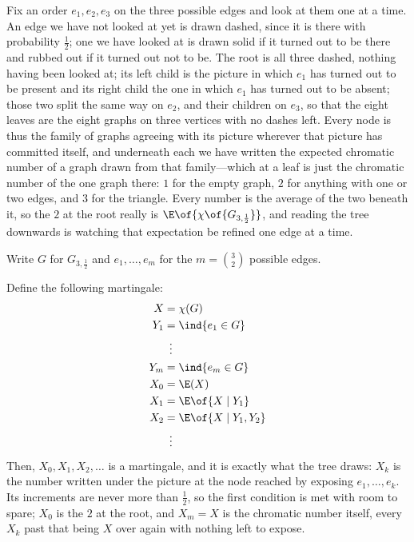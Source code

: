 Fix an order $e_1, e_2, e_3$ on the three possible edges and look at them one at a time. An edge we have not looked at yet is drawn dashed, since it is there with probability $\frac{1}{2}$; one we have looked at is drawn solid if it turned out to be there and rubbed out if it turned out not to be. The root is all three dashed, nothing having been looked at; its left child is the picture in which $e_1$ has turned out to be present and its right child the one in which $e_1$ has turned out to be absent; those two split the same way on $e_2$, and their children on $e_3$, so that the eight leaves are the eight graphs on three vertices with no dashes left. Every node is thus the family of graphs agreeing with its picture wherever that picture has committed itself, and underneath each we have written the expected chromatic number of a graph drawn from that family---which at a leaf is just the chromatic number of the one graph there: $1$ for the empty graph, $2$ for anything with one or two edges, and $3$ for the triangle. Every number is the average of the two beneath it, so the $2$ at the root really is $\E\of{\chi\of{G_{3, \frac{1}{2}}}}$, and reading the tree downwards is watching that expectation be refined one edge at a time.

Write $G$ for $G_{3, \frac{1}{2}}$ and $e_1, \ldots, e_m$ for the $m = \binom{3}{2}$ possible edges.

Define the following martingale:
\begin{align*}
    X &= \chi(G) \\
    Y_1 &= \ind{e_1 \in G} \\
    & \,\,\, \vdots \\
    Y_m &= \ind{e_m \in G} \\
    X_0 &= \E(X) \\
    X_1 &= \E\of{X \mid Y_1} \\
    X_2 &= \E\of{X \mid Y_1, Y_2} \\
    & \,\,\, \vdots
\end{align*}
Then, $X_0, X_1, X_2, \ldots$ is a martingale, and it is exactly what the tree draws: $X_k$ is the number written under the picture at the node reached by exposing $e_1, \ldots, e_k$. Its increments are never more than $\frac{1}{2}$, so the first condition is met with room to spare; $X_0$ is the $2$ at the root, and $X_m = X$ is the chromatic number itself, every $X_k$ past that being $X$ over again with nothing left to expose.

